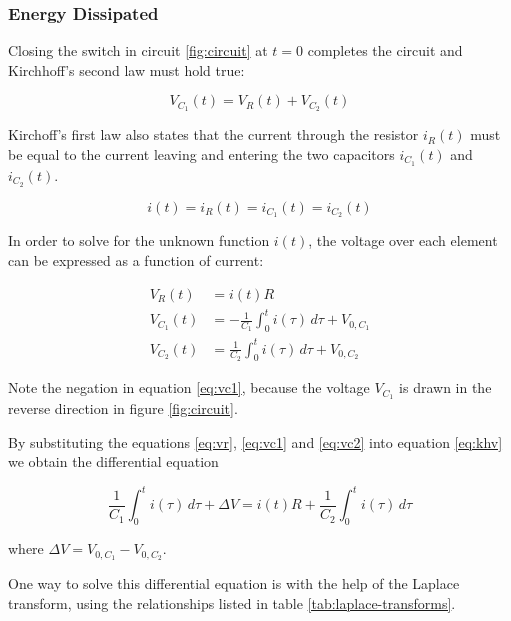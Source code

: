 \subsubsection{Energy Dissipated}

Closing the switch in circuit \ref{fig:circuit} at $t=0$ completes the circuit
and Kirchhoff's second law must hold true:

\begin{equation}
    V_{C_1}(t) = V_R(t) + V_{C_2}(t)
    \label{eq:khv}
\end{equation}

Kirchoff's first  law  also  states  that  the  current  through  the resistor
$i_R(t)$ must be equal to the current leaving and entering the  two capacitors
$i_{C_1}(t)$ and $i_{C_2}(t)$.

\begin{equation}
    i(t) = i_R(t) = i_{C_1}(t) = i_{C_2}(t)
    \label{eq:khi}
\end{equation}

In  order to solve for the unknown function  $i(t)$,  the  voltage  over  each
element can be expressed as a function of current:

\begin{align}
    V_R    (t) &= i(t)R \label{eq:vr}\\
    V_{C_1}(t) &= -\frac{1}{C_1}\int_0^t i(\tau)\,d\tau + V_{0,C_1} \label{eq:vc1}\\
    V_{C_2}(t) &= \frac{1}{C_2}\int_0^t i(\tau)\,d\tau + V_{0,C_2} \label{eq:vc2}
\end{align}

Note  the negation in equation \ref{eq:vc1}, because the voltage $V_{C_1}$  is
drawn in the reverse direction in figure \ref{fig:circuit}.

By substituting the equations  \ref{eq:vr}, \ref{eq:vc1} and \ref{eq:vc2} into
equation \ref{eq:khv} we obtain the differential equation

\begin{equation}
    \frac{1}{C_1}\int_0^t i(\tau)\,d\tau + \Delta V = i(t)R + \frac{1}{C_2}\int_0^t i(\tau)\,d\tau
    \label{eq:diff}
\end{equation}

where $\Delta V = V_{0,C_1} - V_{0,C_2}$.

One way to solve this  differential  equation  is with the help of the Laplace
transform,     using     the      relationships      listed      in      table
\ref{tab:laplace-transforms}.

